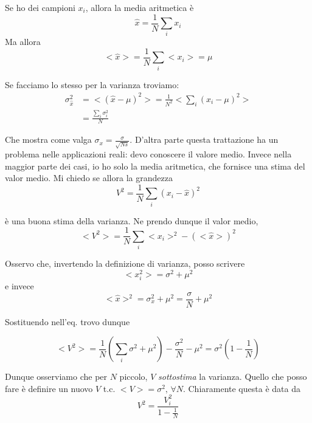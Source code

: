 \documentclass{report}
\begin{document}
Se ho dei campioni $x_i$, allora la media aritmetica è 
\begin{equation}
    \hat{x} = \frac{1}{N}\sum_i x_i 
\end{equation}
Ma allora 
\begin{equation}
    <\hat{x}> = \frac{1}{N}\sum_i <x_i> = \mu
\end{equation}

Se facciamo lo stesso per la varianza troviamo: 
\begin{align}
    \sigma_{\hat{x}}^2 &= <(\hat{x} - \mu)^2> = \frac{1}{N^2}<\sum_i (x_i -\mu)^2> \\ &= \frac{\sum_i \sigma_i^2}{N}
\end{align}

Che mostra come valga $\sigma_x = \frac{\sigma}{\sqrt{Ns}}$. D'altra parte questa trattazione ha un problema nelle applicazioni reali: devo conoscere il valore medio. Invece nella maggior parte dei casi, io ho solo la media aritmetica, che fornisce una stima del valor medio.  Mi chiedo se allora la grandezza 
\begin{equation}
    V^2 = \frac{1}{N}\sum_i (x_i - \hat{x})^2
\end{equation}

è una buona stima della varianza. Ne prendo dunque il valor medio, 
\begin{equation}
    <V^2> = \frac{1}{N}\sum_i <x_i>^2 - (<\hat{x}>)^2
\end{equation}

Osservo che, invertendo la definizione di varianza, posso scrivere
\begin{equation}
    <x_i^2> = \sigma^2 + \mu^2
\end{equation}
e invece 
\begin{equation}
    <\hat{x}>^2 = \sigma^2_x + \mu^2 = \frac{\sigma}{N} + \mu^2
\end{equation}

Sostituendo nell'eq. trovo dunque

\begin{equation}
    <V^2> = \frac{1}{N}\left(\sum_i \sigma^2 + \mu^2 \right) - \frac{\sigma^2}{N} - \mu^2 = \sigma^2\left(1 - \frac{1}{N}\right)
\end{equation}

Dunque osserviamo che per $N$ piccolo, $V$ \emph{sottostima} la varianza. Quello che posso fare è definire un nuovo $V$ t.c. $<V> = \sigma^2, \, \forall N$. Chiaramente questa è data da 
\begin{equation}
    V^2 = \frac{V_i^2}{1 - \frac{1}{N}}
\end{equation}
\end{document}
